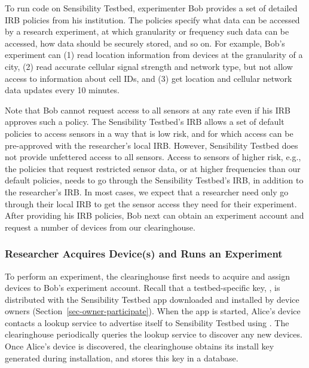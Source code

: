 To run code on Sensibility Testbed, experimenter Bob provides a
set of detailed IRB policies from his institution. The policies specify 
what data can be accessed by a research experiment, at which 
granularity or frequency such data can be accessed, how data 
should be securely stored, and so on. 
For example, Bob's experiment can (1) read location information
from devices at the granularity of a city, (2) read accurate
cellular signal strength and network type, but not allow access to 
information about cell IDs, and (3) get location and
cellular network data updates every 10 minutes. 

Note that Bob cannot request access to all sensors at any rate
even if his IRB approves such a policy. The Sensibility Testbed's
IRB allows a set of default policies to access sensors in a
way that is low risk, and for which access can be pre-approved with the
researcher's local IRB. However, Sensibility Testbed does not
provide unfettered access to all sensors. Access to sensors of
higher risk, e.g., the policies that request restricted sensor data, 
or at higher frequencies than our default policies, 
needs to go through the Sensibility Testbed's IRB,
in addition to the researcher's IRB. In most cases, we expect
that a researcher need only go through their local IRB to get
the sensor access they need for their experiment. After
providing his IRB policies, Bob next can obtain an experiment
account and request a number of devices from our clearinghouse.

\subsubsection{Researcher Acquires Device(s) and Runs an
Experiment}\label{sec-acquire-run}

To perform an experiment, the clearinghouse first needs to 
acquire and assign devices to Bob's experiment account. 
Recall that a testbed-specific key, , is distributed
with the Sensibility Testbed app downloaded and installed by device
owners (Section~\ref{sec-owner-participate}). When the app is started, 
Alice's device contacts a lookup service to advertise itself to Sensibility 
Testbed using . 
The clearinghouse periodically queries the lookup service to
discover any new devices. Once Alice's device is discovered, the
clearinghouse obtains its install key  generated
during installation, and stores this key in a database. 

